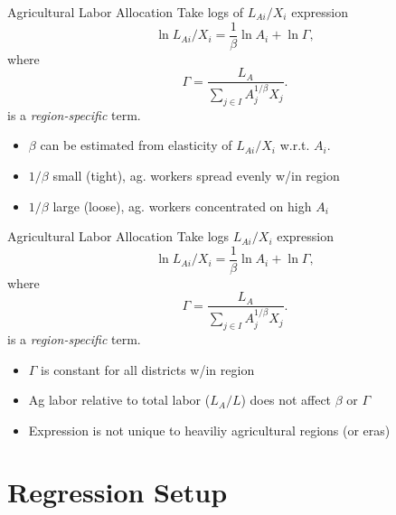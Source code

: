 \documentclass[10pt, xcolor=dvipsnames]{beamer}
\begin{document}
\begin{frame}{Agricultural Labor Allocation}
Take logs of $L_{Ai}/X_i$ expression
\begin{equation}
\ln L_{Ai}/X_i = \frac{1}{\beta} \ln A_{i} + \ln \Gamma, \label{EQ_est}
\end{equation}
where
\begin{equation}
    \Gamma = \frac{L_A}{\sum_{j\in I} A_{j}^{1/\beta}X_{j}}.
\end{equation}
is a \textit{region-specific} term. 

\begin{itemize}
  \item $\beta$ can be estimated from elasticity of $L_{Ai}/X_i$ w.r.t. $A_i$. 
  \item $1/\beta$ small (tight), ag. workers spread evenly w/in region
  \item $1/\beta$ large (loose), ag. workers concentrated on high $A_i$
\end{itemize}
\end{frame}

\begin{frame}{Agricultural Labor Allocation}
Take logs $L_{Ai}/X_i$ expression
\begin{equation}
\ln L_{Ai}/X_i = \frac{1}{\beta} \ln A_{i} + \ln \Gamma, \label{EQ_est}
\end{equation}
where
\begin{equation}
    \Gamma = \frac{L_A}{\sum_{j\in I} A_{j}^{1/\beta}X_{j}}.
\end{equation}
is a \textit{region-specific} term. 

\begin{itemize}
  \item $\Gamma$ is constant for all districts w/in region
  \item Ag labor relative to total labor ($L_A/L$) does not affect $\beta$ or $\Gamma$
  \item Expression is not unique to heaviliy agricultural regions (or eras)
\end{itemize}
\end{frame}

\section{Regression Setup}
\end{document}
